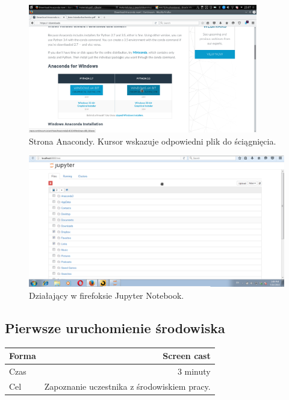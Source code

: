 \documentclass{mwart}
\begin{document}
\begin{center}
  \begin{figure}
  \includegraphics[width=10cm]{install_begin}
  \caption{Strona Anacondy. Kursor wskazuje odpowiedni plik do ściągnięcia.}
  \end{figure}
  \begin{figure}
    \includegraphics[width=12cm]{install_final}
    \caption{Działający w firefoksie Jupyter Notebook.}
  \end{figure}
\end{center}

\subsection{Pierwsze uruchomienie środowiska}
\begin{center}
  \begin{tabular}{lr}
    \toprule
    Forma & Screen cast \\
    \midrule
    Czas & 3 minuty \\
    Cel & Zapoznanie uczestnika z środowiskiem pracy. \\
    \bottomrule
  \end{tabular}
\end{center}
\end{document}
